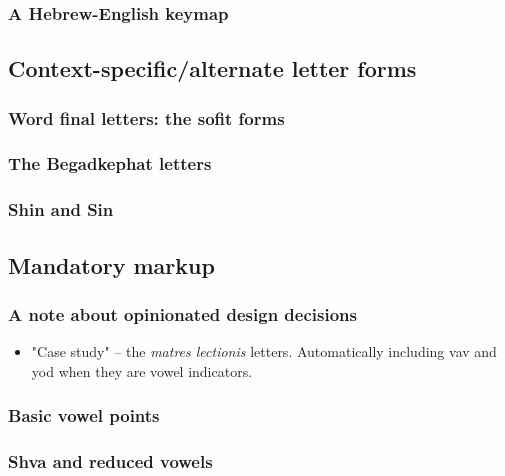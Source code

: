 \documentclass[11pt]{article}
\begin{document}
\subsubsection{A Hebrew-English keymap}
\label{sec:org31b92d4}

\subsection{Context-specific/alternate letter forms}
\label{sec:org21ddced}

\subsubsection{Word final letters: the sofit forms}
\label{sec:orge270111}

\subsubsection{The Begadkephat letters}
\label{sec:orgbab83df}

\subsubsection{Shin and Sin}
\label{sec:orged75125}

\subsection{Mandatory markup}
\label{sec:org9e14eee}

\subsubsection{A note about opinionated design decisions}
\label{sec:org03c9bdc}

\begin{itemize}
\item "Case study" -- the \emph{matres lectionis} letters. Automatically including vav and yod when they are vowel indicators.
\end{itemize}

\subsubsection{Basic vowel points}
\label{sec:org97cffb6}

\subsubsection{Shva and reduced vowels}
\label{sec:org6bc318a}
\end{document}
